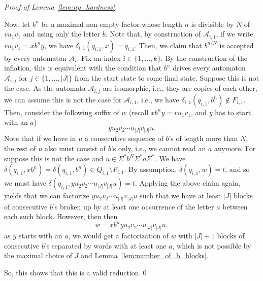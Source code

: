 \begin{toappendix}
\begin{proof}[Proof of Lemma~\ref{lem:np_hardness}]
\begin{enumerate}
  
  Now, let $b^n$ be a maximal non-empty factor whose length $n$ is divisible by $N$ of $vu_1 v_1$
  and using only the letter $b$.
  Note that, by construction of $\mathcal A_{i,1}$,
  if we write $vu_1 v_1 = x b^n y$,
  we have $\delta_{i,1}(q_{i,1}, x) = q_{i,1}$.
  Then, we claim that $b^{n / N}$ is accepted
  by every automaton $\mathcal A_i$. 
  Fix an index $i \in \{1,\ldots,k\}$.
  By the construction of the inflation, this is equivalent
  with the condition that $b^n$ drives every automaton
  $\mathcal A_{i,j}$ for $j \in \{1,\ldots,|J|\}$
  from the start state to some final state.
  Suppose this is not the case. As the automata $\mathcal A_{i,j}$
  are isomorphic, i.e., they are copies of each other, we can assume this is not the case for $\mathcal A_{i,1}$, i.e., 
  we have $\delta_{i,1}(q_{i,1}, b^n) \notin F_{i,1}$.
  Then, consider the following suffix of $w$ (recall $xb^n y = v u_1 v_1$, and $y$ has to start with an $a$) 
  \[
   y u_2 v_2 \cdots u_{|J|} v_{|J|} u.
  \] 
  Note that if we have in $u$ a consecutive sequence of $b$'s
  of length more than $N$, the rest of $u$ also must consist of $b$'s only, i.e.,
  we cannot read an $a$ anymore.
  For suppose this is not the case and $u \in \Sigma^* b^N \Sigma^* a \Sigma^*$.
  We have $\delta(q_{i,1}, xb^n) = \delta(q_{i,1}, b^n) \in Q_{i,1} \setminus F_{i,1}$.
  By assumption, $\delta(q_{i,1}, w) = t$,
  and so we must have $\delta(q_{i,1}, y u_2 v_2 \cdots u_{|J|} v_{|J|} u) = t$.
  Applying the above claim again,
  yields that we can factorize $y u_2 v_2 \cdots u_{|J|} v_{|J|} u$
  such that we have at least $|J|$ blocks of consecutive 
  $b$'s broken up by at least one occurrence of the letter $a$
  between each such block.
  However, then 
  then
  \[
   w = x b^n y u_2 v_2 \cdots u_{|J|} v_{|J|} u,
  \]
  as $y$ starts with an $a$, we would get a factorization
  of $w$ with $|J| + 1$ blocks of consecutive $b$'s separated by words
  with at least one $a$, which is not possible by the maximal choice
  of $J$ and Lemma~\ref{lem:number_of_b_blocks}.
  
 \end{enumerate}
 So, this shows that this is a valid reduction.\qed
\end{proof}
\end{toappendix}
